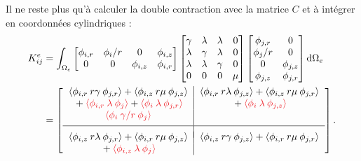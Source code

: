 \documentclass[12pt]{article}
\begin{document}
Il ne reste plus qu'à calculer la double contraction avec la matrice $C$ 
et à intégrer en coordonnées cylindriques :
\begin{equation}
    \begin{aligned}
        K_{ij}^e &= \int_{\Omega_e}
        \begin{bmatrix}
            \phi_{i,r} & \phi_i/r & 0 & \phi_{i,z}\\
            0 & 0 & \phi_{i,z} & \phi_{i,r}
        \end{bmatrix}
        \begin{bmatrix}
            \gamma & \lambda & \lambda & 0\\
            \lambda & \gamma & \lambda & 0\\
            \lambda & \lambda & \gamma & 0\\
            0 & 0 & 0 & \mu
        \end{bmatrix}
        \begin{bmatrix}
            \phi_{j,r} & 0\\
            \phi_{j}/r & 0\\
            0 & \phi_{j,z}\\
            \phi_{j,z} & \phi_{j,r}
        \end{bmatrix} \dd \Omega_e\\
        &=
        \left[
        \setlength{\arraycolsep}{6pt}
        \begin{array}{c|c}
            \langle\phi_{i,r} \:r\gamma  \: \phi_{j,r}\rangle + \langle\phi_{i,z} \: r\mu \: \phi_{j,z}\rangle &
            \langle\phi_{i,r} \:r\lambda \: \phi_{j,z}\rangle + \langle\phi_{i,z} \: r\mu \: \phi_{j,r}\rangle \\
            {} + \textcolor{Red}{\langle\phi_{i,r} \: \lambda \: \phi_j\rangle} + 
            \textcolor{Red}{\langle\phi_i \: \lambda \: \phi_{j,r}\rangle} & 
            {} + \textcolor{Red}{\langle\phi_i \: \lambda \: \phi_{j,z}\rangle}\\
            \textcolor{Red}{\langle\phi_i \: \gamma/r \: \phi_j\rangle} & \\[1ex]
            \hline & \\[-1.5ex]
            \langle\phi_{i,z} \:r\lambda \: \phi_{j,r}\rangle + \langle\phi_{i,r} \: r\mu \: \phi_{j,z}\rangle &
            \langle\phi_{i,z} \:r\gamma  \: \phi_{j,z}\rangle + \langle\phi_{i,r} \: r\mu \: \phi_{j,r}\rangle\\
            {} + \textcolor{Red}{\langle\phi_{i,z} \: \lambda \: \phi_j\rangle} & 
        \end{array}
        \right].
    \end{aligned}
\end{equation}
\end{document}

